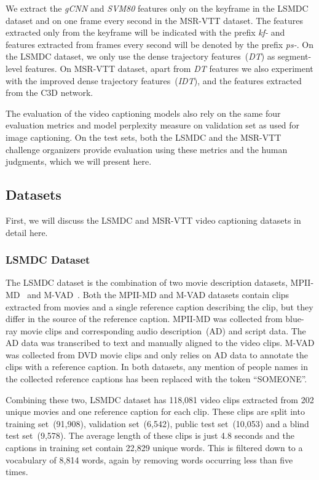 We extract the \emph{gCNN} and \emph{SVM80} features only on the keyframe in the LSMDC
dataset and on one frame every second in the MSR-VTT dataset.
The features extracted only from the keyframe will be indicated with the prefix
\emph{kf-} and features extracted from frames every second will be denoted by
the prefix \emph{ps-}.
On the LSMDC dataset, we only use the dense trajectory features~(\emph{DT}) as
segment-level features.
On MSR-VTT dataset, apart from \emph{DT} features we also experiment with
the improved dense trajectory features~(\emph{IDT}), and the features extracted from
the C3D network.

The evaluation of the video captioning models also rely on the same four
evaluation metrics and model perplexity measure on validation set as used for
image captioning. 
On the test sets, both the LSMDC and the MSR-VTT challenge organizers provide
evaluation using these metrics and the human judgments, which we will present
here.

\subsection{Datasets}
First, we will discuss the LSMDC and MSR-VTT video captioning datasets in detail
here.
\subsubsection{LSMDC Dataset}
\label{subsec:LsmdcData}
The LSMDC dataset is the combination of two movie description datasets,
MPII-MD~\cite{rohrbach15cvpr} and M-VAD~\cite{AtorabiM-VAD2015}.
Both the MPII-MD and M-VAD datasets contain clips extracted from movies and a
single reference caption describing the clip, but they differ in the source of
the reference caption.
MPII-MD was collected from blue-ray movie clips and corresponding audio
description~(AD) and script data.
The AD data was transcribed to text and manually aligned to the video clips.
M-VAD was collected from DVD movie clips and only relies on AD data to annotate
the clips with a reference caption.
In both datasets, any mention of people names in the collected reference
captions has been replaced with the token ``SOMEONE''.

Combining these two, LSMDC dataset has 118,081 video clips extracted from 202
unique movies and one reference caption for each clip.
These clips are split into training set~(91,908), validation set~(6,542), public
test set~(10,053) and a blind test set~(9,578).
The average length of these clips is just 4.8 seconds and the captions in
training set contain 22,829 unique words.
This is filtered down to a vocabulary of 8,814 words, again by removing words
occurring less than five times.

